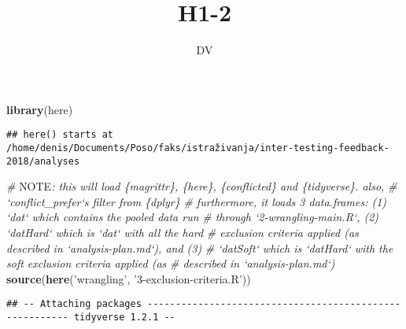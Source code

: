 \documentclass[12pt,]{article}
\title{H1-2}
\author{DV}
\date{}
\newenvironment{Shaded}{\begin{snugshade}}{\end{snugshade}}
\newcommand{\AlertTok}[1]{\textcolor[rgb]{0.94,0.16,0.16}{#1}}
\newcommand{\CommentTok}[1]{\textcolor[rgb]{0.56,0.35,0.01}{\textit{#1}}}
\newcommand{\DataTypeTok}[1]{\textcolor[rgb]{0.13,0.29,0.53}{#1}}
\newcommand{\DecValTok}[1]{\textcolor[rgb]{0.00,0.00,0.81}{#1}}
\newcommand{\KeywordTok}[1]{\textcolor[rgb]{0.13,0.29,0.53}{\textbf{#1}}}
\newcommand{\NormalTok}[1]{#1}
\newcommand{\OperatorTok}[1]{\textcolor[rgb]{0.81,0.36,0.00}{\textbf{#1}}}
\newcommand{\StringTok}[1]{\textcolor[rgb]{0.31,0.60,0.02}{#1}}
\begin{document}
\maketitle

{
\setcounter{tocdepth}{4}
\tableofcontents
}
\begin{Shaded}
\end{Shaded}

\begin{Shaded}
\begin{Highlighting}[]
\KeywordTok{library}\NormalTok{(here)}
\end{Highlighting}
\end{Shaded}

\begin{verbatim}
## here() starts at /home/denis/Documents/Poso/faks/istraživanja/inter-testing-feedback-2018/analyses
\end{verbatim}

\begin{Shaded}
\begin{Highlighting}[]
\CommentTok{# }\AlertTok{NOTE}\CommentTok{: this will load \{magrittr\}, \{here\}, \{conflicted\} and \{tidyverse\}. also,}
\CommentTok{# `conflict_prefer`s filter from \{dplyr\}}
\CommentTok{# furthermore, it loads 3 data.frames: (1) `dat` which contains the pooled data run}
\CommentTok{# through `2-wrangling-main.R`, (2) `datHard` which is `dat` with all the hard}
\CommentTok{# exclusion criteria applied (as described in `analysis-plan.md`), and (3)}
\CommentTok{# `datSoft` which is `datHard` with the soft exclusion criteria applied (as}
\CommentTok{# described in `analysis-plan.md`)}
\KeywordTok{source}\NormalTok{(}\KeywordTok{here}\NormalTok{(}\StringTok{'wrangling'}\NormalTok{, }\StringTok{'3-exclusion-criteria.R'}\NormalTok{))}
\end{Highlighting}
\end{Shaded}

\begin{verbatim}
## -- Attaching packages -------------------------------------------------------- tidyverse 1.2.1 --
\end{verbatim}
\end{document}
